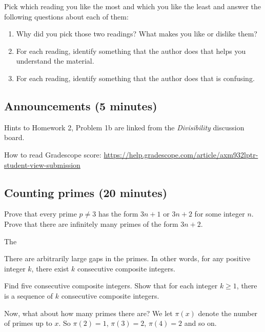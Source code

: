 \documentclass[letterpaper, 11 pt]{article}
\begin{document}
Pick which reading you like the most and which you like the least and answer the following questions about each of them:
\begin{enumerate}
 \item Why did you pick those two readings? What makes you like or dislike them?
 \item For each reading, identify something that the author does that helps you understand the material.
 \item For each reading, identify something that the author does that is confusing.
 \end{enumerate}


\subsection{Announcements (5 minutes)}
Hints to Homework 2, Problem 1b are linked from the \emph{Divisibility} discussion board.

How to read Gradescope score: \url{https://help.gradescope.com/article/axm932lptr-student-view-submission}

\subsection{Counting primes (20 minutes)}
\begin{br}
Prove that every prime $p\neq3$ has the form $3n+1$ or $3n+2$ for some integer $n$. Prove that there are infinitely many primes of the form $3n+2$. 
\end{br}
\begin{hint}
 The 
\end{hint}


\begin{thm}
 There are arbitrarily large gaps in the primes. In other words, for any positive integer $k$, there exist $k$ consecutive composite integers.
\end{thm}
\begin{br}
Find five consecutive composite integers. Show that for each integer $k\geq 1$, there is a sequence of $k$ consecutive composite integers.
\end{br}

Now, what about how many primes there are? We let $\pi(x)$ denote the number of primes up to $x$. So $\pi(2)=1$, $\pi(3)=2$, $\pi(4)=2$ and so on.
\end{document}
